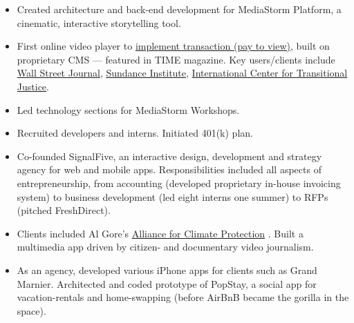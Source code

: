 \documentclass[a4paper,10pt]{memoir} %
\begin{document}
\begin{itemize}
	\item Created architecture and back-end development for MediaStorm 
	Platform, a cinematic, interactive storytelling tool. 
	
	\item First online video player to \href{http://time.com/46716/game-changer-mediastorm-launches-pay-per-story-video-player/}{implement 
	transaction (pay to view)}, built on proprietary CMS --- featured in 
	TIME magazine. Key users/clients include \href{https://mediastorm.com/clients/2018-icp-infinity-awards}{Wall Street Journal}, \href{https://mediastorm.com/clients/sundance-short-film-challenge}{Sundance 
	Institute}, \href{https://mediastorm.com/clients/i-am-not-who-they-think-i-am-for-ictj}{International Center for 
	Transitional Justice}. 
	
	\item Led technology sections for MediaStorm Workshops.
	
	\item Recruited developers and interns. Initiated 401(k) plan.
\end{itemize}
\Sep %

\clearpage %
\userinformation %
\framebreak %


\begin{itemize}
	\item Co-founded SignalFive, an interactive design, development and 
	strategy agency for web and mobile apps. Responsibilities included all 
	aspects of entrepreneurship, from accounting (developed proprietary 
	in-house invoicing system) to business development (led eight interns 
	one summer) to RFPs (pitched FreshDirect).

	\item Clients included Al Gore's \href{https://www.climaterealityproject.org/}{Alliance for Climate Protection}
	. Built a multimedia app driven by citizen- and documentary video journalism.

	\item As an agency, developed various iPhone apps for clients such as 
	Grand Marnier. Architected and coded prototype of PopStay, a social app 
	for vacation-rentals and home-swapping (before AirBnB became the gorilla 
	in the space).
\end{itemize}
\Sep %
\end{document}
